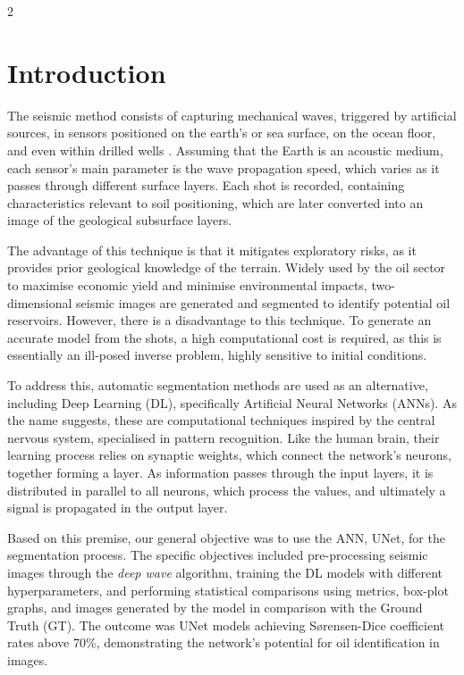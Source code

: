 \documentclass[a4paper,twoside,12pt]{article}
\begin{document}
\vspace{8mm}
\begin{multicols}{2} %
\section{Introduction}

The seismic method consists of capturing mechanical waves, triggered by artificial sources, in sensors positioned on the earth's or sea surface, on the ocean floor, and even within drilled wells \cite{felipe}. Assuming that the Earth is an acoustic medium, each sensor’s main parameter is the wave propagation speed, which varies as it passes through different surface layers. Each shot is recorded, containing characteristics relevant to soil positioning, which are later converted into an image of the geological subsurface layers.

The advantage of this technique is that it mitigates exploratory risks, as it provides prior geological knowledge of the terrain. Widely used by the oil sector to maximise economic yield and minimise environmental impacts, two-dimensional seismic images are generated and segmented to identify potential oil reservoirs. However, there is a disadvantage to this technique. To generate an accurate model from the shots, a high computational cost is required, as this is essentially an ill-posed inverse problem, highly sensitive to initial conditions.

To address this, automatic segmentation methods are used as an alternative, including Deep Learning (DL), specifically Artificial Neural Networks (ANNs). As the name suggests, these are computational techniques inspired by the central nervous system, specialised in pattern recognition. Like the human brain, their learning process relies on synaptic weights, which connect the network’s neurons, together forming a layer. As information passes through the input layers, it is distributed in parallel to all neurons, which process the values, and ultimately a signal is propagated in the output layer.

Based on this premise, our general objective was to use the ANN, UNet, for the segmentation process. The specific objectives included pre-processing seismic images through the \textit{deep wave} algorithm, training the DL models with different hyperparameters, and performing statistical comparisons using metrics, box-plot graphs, and images generated by the model in comparison with the Ground Truth (GT). The outcome was UNet models achieving Sørensen-Dice coefficient rates above 70\%, demonstrating the network’s potential for oil identification in images.


\end{multicols}
\end{document}
